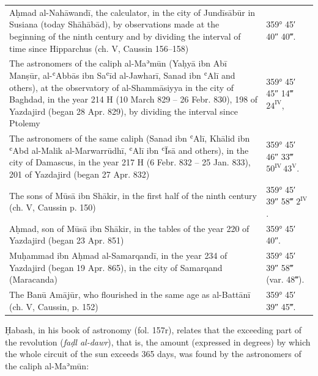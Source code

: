 \documentclass[11pt]{article}
\begin{document}
\begin{center}\small\begin{tabular}{p{100mm}l}
Aḥmad al-Nahāwandī, the calculator, in the city of Jundīsābūr in Susiana (today Shāhābād), by observations made at the beginning of the ninth century and by dividing the interval of time since Hipparchus (ch. V, Caussin 156–158) & 359° 45′ 40″ 40‴. \\
The astronomers of the caliph al-Maʾmūn (Yaḥyā ibn Abī Manṣūr, al-ʿAbbās ibn Saʿīd al-Jawharī, Sanad ibn ʿAlī and others), at the observatory of al-Shammāsiyya\footnotemark{} in the city of Baghdad, in the year 214 H (10 March 829 – 26 Febr. 830), 198 of Yazdajird (began 28 Apr. 829), by dividing the interval since Ptolemy\footnotemark{} & 359° 45′ 45″ 14‴ $24^{\mathrm{IV}}$, \\
The astronomers of the same caliph (Sanad ibn ʿAlī, Khālid ibn ʿAbd al-Malik al-Marwarrūdhī, ʿAlī ibn ʿĪsā and others), in the city of Damascus, in the year 217 H (6 Febr. 832 – 25 Jan. 833), 201 of Yazdajird (began 27 Apr. 832) & 359° 45′ 46″ 33‴ $50^{\mathrm{IV}}\,43^{\mathrm{V}}$. \\
The sons of Mūsā ibn Shākir, in the first half of the ninth century (ch. V, Caussin p. 150) & 359° 45′ 39″ 58‴ $2^{\mathrm{IV}}$. \\
Aḥmad, son of Mūsā ibn Shākir, in the tables of the year 220 of Yazdajird (began 23 Apr. 851) & 359° 45′ 40″. \\
Muḥammad ibn Aḥmad al-Samarqandī, in the year 234 of Yazdajird (began 19 Apr. 865), in the city of Samarqand (Maracanda) & 359° 45′ 39″ 58‴ (var. 48‴). \\
The Banū Amājūr, who flourished in the same age as al-Battānī (ch. V, Caussin, p. 152) & 359° 45′ 39″ 45‴. \\
\end{tabular}\end{center}
\addtocounter{footnote}{-2}
\par Ḥabash, in his book of astronomy (fol. 157r), relates that the exceeding part of the revolution (\emph{faḍl al-dawr}), that is, the amount (expressed in degrees) by which the whole circuit of the sun exceeds 365 days, was found by the astronomers of the caliph al-Maʾmūn:\par
\end{document}
